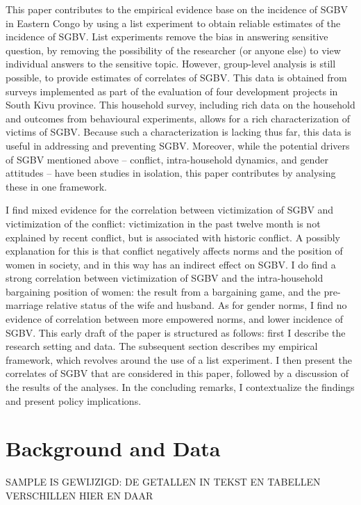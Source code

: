 \documentclass[10pt,a4paper,abstract=on]{scrartcl} %
\begin{document}
This paper contributes to the empirical evidence base on the incidence of SGBV in Eastern Congo by using a list experiment to obtain reliable estimates of the incidence of SGBV. List experiments remove the bias in answering sensitive question, by removing the possibility of the researcher (or anyone else) to view individual answers to the sensitive topic. However, group-level analysis is still possible, to provide estimates of correlates of SGBV. This data is obtained from surveys implemented as part of the evaluation of four development projects in South Kivu province. This household survey, including rich data on the household and outcomes from behavioural experiments, allows for a rich characterization of victims of SGBV.  Because such a characterization is lacking thus far, this data is useful in addressing and preventing SGBV. Moreover, while the potential drivers of SGBV mentioned above -- conflict, intra-household dynamics, and gender attitudes -- have been studies in isolation, this paper contributes by analysing these in one framework.

I find mixed evidence for the correlation between victimization of SGBV and victimization of the conflict: victimization in the past twelve month is not explained by recent conflict, but is associated with historic conflict. A possibly explanation for this is that conflict negatively affects norms and the position of women in society, and in this way has an indirect effect on SGBV. I do find a strong correlation between victimization of SGBV and the intra-household bargaining position of women: the result from a bargaining game, and the pre-marriage relative status of the wife and husband. As for gender norms, I find no evidence of correlation between more empowered norms, and lower incidence of SGBV. This early draft of the paper is structured as follows: first I describe the research setting and data. The subsequent section describes my empirical framework, which revolves around the use of a list experiment. I then present the correlates of SGBV that are considered in this paper, followed by a discussion of the results of the analyses. In the concluding remarks, I contextualize the findings and present policy implications.

\section*{Background and Data}
SAMPLE IS GEWIJZIGD: DE GETALLEN IN TEKST EN TABELLEN VERSCHILLEN HIER EN DAAR
\end{document}

